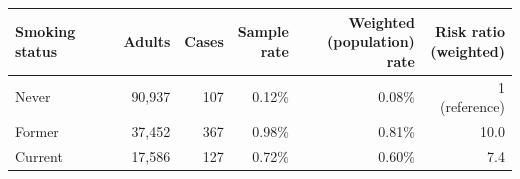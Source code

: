 \begin{tabular}{lrrrrr}
\toprule
Smoking status & Adults & Cases & \makecell[b]{Sample\\{}rate} & \makecell[b]{Weighted\\{}(population) rate} & \makecell[b]{Risk ratio\\{}(weighted)} \\
\midrule
Never & 90,937 & 107 & 0.12\% & 0.08\% & 1 (reference) \\
Former & 37,452 & 367 & 0.98\% & 0.81\% & 10.0 \\
Current & 17,586 & 127 & 0.72\% & 0.60\% & 7.4 \\
\bottomrule
\end{tabular}
